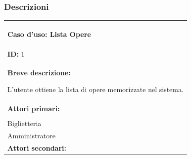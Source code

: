 \documentclass{article}
\begin{document}
            \subsubsection{Descrizioni}
                \begin{table}[t]
                    \centering
                    \begin{tabular}{|p{\linewidth}|}
                        \hline
                        \cellcolor{gray!100}
                        \begin{center}
                            \color{white}
                            \textbf{Caso d'uso:} Lista Opere
                        \end{center} \\
                        \hline
                        \textbf{ID:} 1 \\
                        \hline
                        \cellcolor{gray!20}
                        \textbf{Breve descrizione:} 
                            
                        L'utente ottiene la lista di opere memorizzate nel sistema.\\
                        \hline
                        \textbf{Attori primari:} \\
                        \begin{minipage}{\linewidth}
                            Cliente \\
                            Biglietteria \\
                            Amministratore
                        \end{minipage}
                        \vspace{1pt} \\
                        \hline
                        \textbf{Attori secondari:}


\end{tabular}
\end{table}
\end{document}
